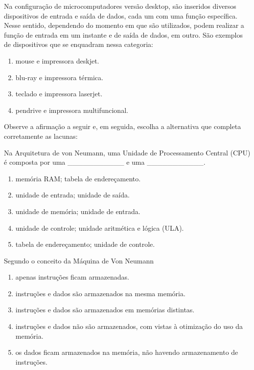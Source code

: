 \documentclass[aspectratio=169,
				xcolor=table]{beamer}
\begin{document}
	\begin{frame}
		Na configuração de microcomputadores versão desktop, são inseridos diversos dispositivos de entrada e saída de dados, cada um com uma função específica. Nesse sentido, dependendo do momento em que são utilizados, podem realizar a função de entrada em um instante e de saída de dados, em outro. São exemplos de dispositivos que se enquadram nessa categoria: 
		
		\vspace{1em}
		\begin{enumerate}[a]
			\normalsize
			\item mouse e impressora deskjet.
			\item blu-ray e impressora térmica.
			\item teclado e impressora laserjet.
			\item pendrive e impressora multifuncional.
		\end{enumerate}
	\end{frame}	
	
	\begin{frame}
		Observe a afirmação a seguir e, em seguida, escolha a alternativa que completa corretamente as lacunas:
		
		\vspace{1em}
		Na Arquitetura de von Neumann, uma Unidade de Processamento Central (CPU) é composta por uma ___________ e uma ___________.
		
		\vspace{1em}
		\begin{enumerate}[a]
			\normalsize
			\item memória RAM; tabela de endereçamento.
			\item unidade de entrada; unidade de saída.
			\item unidade de memória; unidade de entrada.
			\item unidade de controle; unidade aritmética e lógica (ULA).
			\item tabela de endereçamento; unidade de controle.

		\end{enumerate}
	\end{frame} 
	
	\begin{frame}
		Segundo o conceito da Máquina de Von Neumann
		
		\vspace{1em}
		\begin{enumerate}[a]
			\normalsize
			\item apenas instruções ficam armazenadas.
			\item instruções e dados são armazenados na mesma memória.
			\item instruções e dados são armazenados em memórias distintas.
			\item instruções e dados não são armazenados, com vistas à otimização do uso da memória.
			\item os dados ficam armazenados na memória, não havendo armazenamento de instruções.
		\end{enumerate}
	\end{frame}
	
\end{document}
